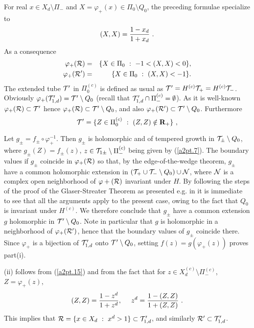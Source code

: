 \documentclass[a4paper,a4paper]{article}
\def\RR{\mathbb R}
\def\bR{{\bf R}}
\def\NN{{\cal N}}
\def\RR{{\cal R}}
\def\TT{{\cal T}}
\def \vhi{\varphi}
\def\Xcd{X_d^{(c)}}
\begin{document}
For real $x \in X_d \setminus \Pi_-$ and
$X = \vhi_+(x) \in \Pi_0 \setminus Q_0$,
the preceding formulae specialize to
\begin{equation}
(X,X) = {1-x_d \over 1+x_d}\ .
\label{a2pt.11}\end{equation}
As a consequence
\begin{eqnarray}
\vhi_+(\RR) &=& \{X \in \Pi_0\ :\ -1 < (X,X) <0\},
\label{a2pt.12}\\
\vhi_+(\RR') &=& \{X \in \Pi_0\ :\ (X,X) <-1\}.
\label{a2pt.13}\end{eqnarray}
The extended tube $\TT'$ in $\Pi_0^{(c)}$ is defined as usual
as $\TT' = H^{(c)}\TT_+ = H^{(c)}\TT_-$. Obviously
$\vhi_+(\TT'_{1,d}) = \TT' \setminus Q_0$
(recall that $\TT'_{1,d}\cap \Pi_-^{(c)} = \emptyset$).
As it is well-known $\vhi_+(\RR) \subset \TT'$ hence
$\vhi_+(\RR) \subset \TT' \setminus Q_0$, and also
$\vhi_+(\RR') \subset \TT' \setminus Q_0$. Furthermore
\begin{equation}
\TT' = \{Z \in \Pi_0^{(c)}\ :\ (Z,Z) \notin \bR_+\}\ ,
\label{a2pt.15}\end{equation}

Let $g_\pm = f_\pm \circ \vhi_+^{-1}$. Then $g_\pm$ is holomorphic and
of tempered growth in $\TT_\pm \setminus Q_0$, where
$g_\pm(Z) = f_\pm(z)$, $z \in \TT_{1\pm} \setminus \Pi_-^{(c)}$
being given by (\ref{a2pt.7}). The boundary values if $g_\pm$
coincide in $\vhi_+(\RR)$ so that, by the edge-of-the-wedge theorem,
$g_\pm$ have a common holomorphic extension in
$(\TT_+\cup\TT_- \setminus Q_0)\cup \NN$, where $\NN$ is a complex
open neighborhood of $\vhi+(\RR)$ invariant under $H$.
By following the steps of the proof of the Glaser-Streater Theorem
as presented e.g. in \cite{BEG} it is immediate to see
that all the arguments apply to the present case, owing to the fact
that $Q_0$ is invariant under $H^{(c)}$.
We therefore conclude that $g_\pm$ have a common extension $g$
holomorphic in $\TT'\setminus Q_0$. Note in particular that $g$
is holomorphic in a neighborhood of $\vhi_+(\RR')$, hence that
the boundary values of $g_\pm$  coincide there. Since $\vhi_+$
is a bijection of $\TT'_{1,d}$ onto $\TT' \setminus Q_0$,
setting $f(z) = g(\vhi_+(z))$ proves part(i).

\noindent(ii) follows from (\ref{a2pt.15}) and from the fact that
for $z \in \Xcd \setminus \Pi_-^{(c)}$, $Z = \vhi_+(z)$,
\begin{equation}
(Z,Z) = {1-z^d \over 1+z^d},\ \ \ \
z^d = {1 -(Z,Z)\over 1+(Z,Z)}\ .
\label{a2pt.16}\end{equation}
This implies that $\RR = \{x \in X_d\ :\ x^d > 1\} \subset \TT'_{1,d}$,
and similarly $\RR' \subset \TT'_{1,d}$.
\end{document}
